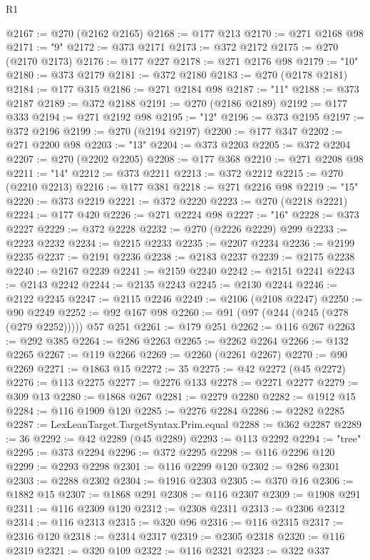 \begin{lexlean}{R1}
\begin{coremodule}
@2167 := @270 (@2162 @2165)
@2168 := @177 @213
@2170 := @271 @2168 @98
@2171 := "9"
@2172 := @373 @2171
@2173 := @372 @2172
@2175 := @270 (@2170 @2173)
@2176 := @177 @227
@2178 := @271 @2176 @98
@2179 := "10"
@2180 := @373 @2179
@2181 := @372 @2180
@2183 := @270 (@2178 @2181)
@2184 := @177 @315
@2186 := @271 @2184 @98
@2187 := "11"
@2188 := @373 @2187
@2189 := @372 @2188
@2191 := @270 (@2186 @2189)
@2192 := @177 @333
@2194 := @271 @2192 @98
@2195 := "12"
@2196 := @373 @2195
@2197 := @372 @2196
@2199 := @270 (@2194 @2197)
@2200 := @177 @347
@2202 := @271 @2200 @98
@2203 := "13"
@2204 := @373 @2203
@2205 := @372 @2204
@2207 := @270 (@2202 @2205)
@2208 := @177 @368
@2210 := @271 @2208 @98
@2211 := "14"
@2212 := @373 @2211
@2213 := @372 @2212
@2215 := @270 (@2210 @2213)
@2216 := @177 @381
@2218 := @271 @2216 @98
@2219 := "15"
@2220 := @373 @2219
@2221 := @372 @2220
@2223 := @270 (@2218 @2221)
@2224 := @177 @420
@2226 := @271 @2224 @98
@2227 := "16"
@2228 := @373 @2227
@2229 := @372 @2228
@2232 := @270 (@2226 @2229) @299
@2233 := @2223 @2232
@2234 := @2215 @2233
@2235 := @2207 @2234
@2236 := @2199 @2235
@2237 := @2191 @2236
@2238 := @2183 @2237
@2239 := @2175 @2238
@2240 := @2167 @2239
@2241 := @2159 @2240
@2242 := @2151 @2241
@2243 := @2143 @2242
@2244 := @2135 @2243
@2245 := @2130 @2244
@2246 := @2122 @2245
@2247 := @2115 @2246
@2249 := @2106 (@2108 @2247)
@2250 := @90 @2249
@2252 := @92 @167 @98
@2260 := @91 (@97 (@244 (@245 (@278 (@279 @2252))))) @57 @251
@2261 := @179 @251
@2262 := @116 @267
@2263 := @292 @385
@2264 := @286 @2263
@2265 := @2262 @2264
@2266 := @132 @2265
@2267 := @119 @2266
@2269 := @2260 (@2261 @2267)
@2270 := @90 @2269
@2271 := @1863 @15
@2272 := 35
@2275 := @42 @2272 (@45 @2272)
@2276 := @113 @2275
@2277 := @2276 @133
@2278 := @2271 @2277
@2279 := @309 @13
@2280 := @1868 @267
@2281 := @2279 @2280
@2282 := @1912 @15
@2284 := @116 @1909 @120
@2285 := @2276 @2284
@2286 := @2282 @2285
@2287 := LexLeanTarget.TargetSyntax.Prim.equal
@2288 := @362 @2287
@2289 := 36
@2292 := @42 @2289 (@45 @2289)
@2293 := @113 @2292
@2294 := "tree"
@2295 := @373 @2294
@2296 := @372 @2295
@2298 := @116 @2296 @120
@2299 := @2293 @2298
@2301 := @116 @2299 @120
@2302 := @286 @2301
@2303 := @2288 @2302
@2304 := @1916 @2303
@2305 := @370 @16
@2306 := @1882 @15
@2307 := @1868 @291
@2308 := @116 @2307
@2309 := @1908 @291
@2311 := @116 @2309 @120
@2312 := @2308 @2311
@2313 := @2306 @2312
@2314 := @116 @2313
@2315 := @320 @96
@2316 := @116 @2315
@2317 := @2316 @120
@2318 := @2314 @2317
@2319 := @2305 @2318
@2320 := @116 @2319
@2321 := @320 @109
@2322 := @116 @2321
@2323 := @322 @337

\end{coremodule}
\end{lexlean}
